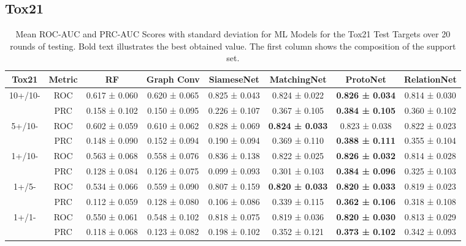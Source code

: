 \documentclass[journal=acscii,manuscript=article]{achemso}
\begin{document}
\subsection{Tox21}

\begin{table}
\caption{Mean ROC-AUC and PRC-AUC Scores with standard deviation for ML Models for the Tox21 Test Targets over 20 rounds of testing. Bold text illustrates the best obtained value. The first column shows the composition of the support set.}
\centering
\begin{tabular}{@{}cccccccc@{}}
\hline
\textbf{Tox21} & \textbf{Metric} & \textbf{RF} & \textbf{Graph Conv} & \textbf{SiameseNet} & \textbf{MatchingNet} & \textbf{ProtoNet} & \textbf{RelationNet} \\
\hline
10+/10- & ROC & 0.617 ± 0.060 & 0.620 ± 0.065 & 0.825 ± 0.043 & 0.824 ± 0.022 & \textbf{0.826 ± 0.034} & 0.814 ± 0.030 \\ & PRC & 0.158 ± 0.102 & 0.150 ± 0.095 & 0.226 ± 0.107 & 0.367 ± 0.105 & \textbf{0.384 ± 0.105} & 0.360 ± 0.102\\
\hline
5+/10- & ROC & 0.602 ± 0.059 & 0.610 ± 0.062 & 0.828 ± 0.069 & \textbf{0.824 ± 0.033} & 0.823 ± 0.038 & 0.822 ± 0.023 \\ & PRC & 0.148 ± 0.090 & 0.152 ± 0.094 & 0.190 ± 0.094 & 0.369 ± 0.110 & \textbf{0.388 ± 0.111} & 0.355 ± 0.104\\
\hline
1+/10- & ROC & 0.563 ± 0.068 & 0.558 ± 0.076 & 0.836 ± 0.138 & 0.822 ± 0.025 & \textbf{0.826 ± 0.032} & 0.814 ± 0.028 \\ & PRC & 0.128 ± 0.084 & 0.126 ± 0.075 & 0.099 ± 0.093 & 0.301 ± 0.103 & \textbf{0.384 ± 0.096} & 0.325 ± 0.103\\
\hline
1+/5- & ROC & 0.534 ± 0.066 & 0.559 ± 0.090 & 0.807 ± 0.159 & \textbf{0.820 ± 0.033} & \textbf{0.820 ± 0.033} & 0.819 ± 0.023 \\ & PRC & 0.112 ± 0.059 & 0.128 ± 0.080 & 0.106 ± 0.086 & 0.339 ± 0.115 & \textbf{0.362 ± 0.106} & 0.318 ± 0.108\\
\hline
1+/1- & ROC & 0.550 ± 0.061 & 0.548 ± 0.102 & 0.818 ± 0.075 & 0.819 ± 0.036 & \textbf{0.820 ± 0.030} & 0.813 ± 0.029 \\ & PRC & 0.118 ± 0.068 & 0.123 ± 0.082 & 0.198 ± 0.102 & 0.352 ± 0.121 & \textbf{0.373 ± 0.102} & 0.342 ± 0.093\\
\hline
\end{tabular}
\label{table:Tox21-mean}
\end{table}
\end{document}
